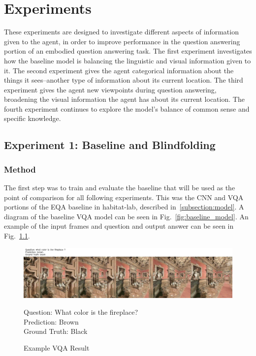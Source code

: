 \chapter{Experiments}
These experiments are designed to investigate different aspects of information given to the agent, in order to improve performance in the question answering portion of an embodied question answering task. The first experiment investigates how the baseline model is balancing the linguistic and visual information given to it. The second experiment gives the agent categorical information about the things it sees--another type of information about its current location. The third experiment gives the agent new viewpoints during question answering, broadening the visual information the agent has about its current location. The fourth experiment continues to explore the model's balance of common sense and specific knowledge. 

\section{Experiment 1: Baseline and Blindfolding}
\label{sec:exp_1}
\subsection{Method}
The first step was to train and evaluate the baseline that will be used as the point of comparison for all following experiments. This was the CNN and VQA portions of the EQA baseline in habitat-lab, described in~\ref{subsection:model}. A diagram of the baseline VQA model can be seen in Fig.~\ref{fig:baseline_model}. An example of the input frames and question and output answer can be seen in Fig.~\ref{fig:example_vqa_result}.\newline

\begin{figure}[h]
	\centering
        \includegraphics[width=\textwidth]{./figure/results/baseline_and_blindfolding/images/ckpt_23_781_image.jpg}
    \captionsetup{justification=raggedright, textfont=footnotesize}
	\caption*{Question: What color is the fireplace? \\
	Prediction: Brown \\
	Ground Truth: Black}
    \captionsetup{labelfont=bf, textfont=normal,
			justification=centering,
			singlelinecheck=false}	
	\caption{Example VQA Result} %
	\label{fig:example_vqa_result}
\end{figure}

